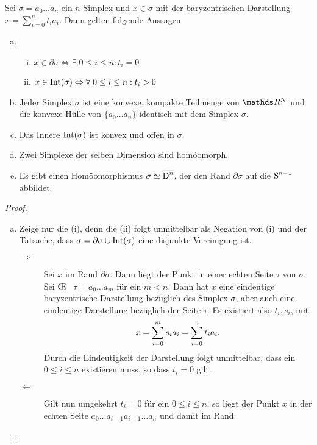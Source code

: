 \begin{Satz}\label{satz:simp}
  \normalfont Sei $\sigma = a_0 \ldots a_n $ ein $n$-Simplex und
  $x \in \sigma$ mit der baryzentrischen Darstellung
  $x=\sum\limits_{i=0}^n t_i a_i$. Dann gelten folgende Aussagen
  \begin{enumerate}[(a)]
  \item
    \begin{enumerate}[(i)]
    \item
      $x \in \partial\sigma \Leftrightarrow \exists \; 0 \leq i \leq n
      : t_i = 0$ \label{satz:a}
    \item
      $x \in \Int(\sigma) \Leftrightarrow \forall \; 0 \leq i \leq n :
      t_i > 0$
  \end{enumerate}
  \item Jeder Simplex $\sigma$ ist eine konvexe, kompakte Teilmenge 
    von $\R^N$ und die konvexe Hülle von
    $\{ a_0 \ldots a_n \}$ identisch mit dem Simplex $\sigma$.
  \item Das Innere $\Int(\sigma)$ ist konvex und offen in $\sigma$.
  \item Zwei Simplexe der selben Dimension sind homöomorph.
  \item Es gibt einen Homöomorphismus $\sigma \simeq \overline{\D^n}$, der den
    Rand $\partial\sigma$ auf die $\Sp^{n-1}$ abbildet.
  \end{enumerate}
  \begin{proof}
    \begin{enumerate}[(a):]
    \item Zeige nur die (i), denn die (ii) folgt unmittelbar als
      Negation von (i) und der Tatsache, dass
      $\sigma = \partial\sigma \cup \Int(\sigma)$ eine disjunkte
      Vereinigung ist.
      \begin{description}
      \item[\glqq $\Rightarrow$\grqq] Sei $x$ im Rand
        $\partial\sigma$. Dann liegt der Punkt in einer echten Seite
        $\tau$ von $\sigma$. Sei \OE~ $\tau = a_0 \ldots a_m$ für ein
        $m < n$. Dann hat $x$ eine eindeutige baryzentrische
        Darstellung bezüglich des Simplex $\sigma$, aber auch eine
        eindeutige Darstellung bezüglich der Seite $\tau$. Es
        existiert also $t_i,s_i$, mit
        \begin{gather*}
          x = \sp{0}{m} s_i a_i = \sp{0}{n} t_i a_i .
        \end{gather*}
        Durch die Eindeutigkeit der Darstellung folgt unmittelbar,
        dass ein $0 \leq i \leq n$ existieren muss, so dass $t_i = 0$
        gilt.
      \item[\glqq $\Leftarrow$ \grqq] Gilt nun umgekehrt $t_i = 0$ für
        ein $0 \leq i \leq n$, so liegt der Punkt $x$ in der echten Seite
        $a_0 \ldots a_{i-1} a_{i+1} \ldots a_n$ und damit im Rand.
      \end{description}



\end{enumerate}
\end{proof}
\end{Satz}
